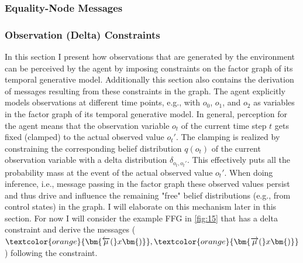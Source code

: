 \subsubsection{Equality-Node Messages}



\subsubsection{Observation (Delta) Constraints}

In this section I present how observations that are generated by the environment can be perceived by the agent by imposing constraints on the factor graph of its temporal generative model. Additionally this section also contains the derivation of messages resulting from these constraints in the graph. The agent explicitly models observations at different time points, e.g., with \(o_0\), \(o_1\), and \(o_2\) as variables in the factor graph of its temporal generative model. In general, perception for the agent means that the observation variable \(o_t\) of the current time step \(t\) gets fixed (clamped) to the actual observed value \(o_t'\). The clamping is realized by constraining the corresponding belief distribution \(q(o_t)\) of the current observation variable with a delta distribution \(\delta_{o_t,o_t'}\). This effectively puts all the probability mass at the event of the actual observed value \(o_t'\). When doing inference, i.e., message passing in the factor graph these observed values persist and thus drive and influence the remaining "free" belief distributions (e.g., from control states) in the graph. I will elaborate on this mechanism later in this section.
For now I will consider the example FFG in \cref{fig:15} that has a delta constraint and derive the messages (\(\textcolor{orange}{\bm{\overleftarrow{\mu}(}x\bm{)}}, \textcolor{orange}{\bm{\overrightarrow{\mu}(}x\bm{)}}\)) following the constraint.
